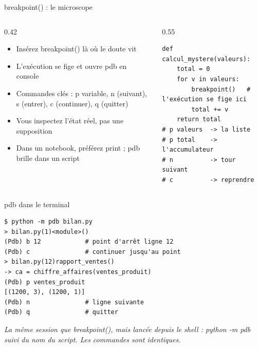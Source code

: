 \documentclass[aspectratio=169,11pt]{beamer}
\begin{document}
\begin{frame}[fragile]{breakpoint() : le microscope}
\begin{columns}[t]
\begin{column}{0.42\textwidth}
\begin{itemize}
  \setlength{\itemsep}{1.5pt}\setlength{\parskip}{0pt}
  \item Insérez breakpoint() là où le doute vit
  \item L'exécution se fige et ouvre pdb en console
  \item Commandes clés : p variable, n (suivant), s (entrer), c (continuer), q (quitter)
  \item Vous inspectez l'état réel, pas une supposition
  \item Dans un notebook, préférez print ; pdb brille dans un script
\end{itemize}
\end{column}
\hspace{0.02\textwidth}
\begin{column}{0.55\textwidth}
\begin{lstlisting}[style=pysmall]
def calcul_mystere(valeurs):
    total = 0
    for v in valeurs:
        breakpoint()   # l'exécution se fige ici
        total += v
    return total
# p valeurs  -> la liste
# p total    -> l'accumulateur
# n          -> tour suivant
# c          -> reprendre
\end{lstlisting}
\end{column}
\end{columns}
\end{frame}

\begin{frame}[fragile]{pdb dans le terminal}

\begin{lstlisting}[style=py]
$ python -m pdb bilan.py
> bilan.py(1)<module>()
(Pdb) b 12            # point d'arrêt ligne 12
(Pdb) c               # continuer jusqu'au point
> bilan.py(12)rapport_ventes()
-> ca = chiffre_affaires(ventes_produit)
(Pdb) p ventes_produit
[(1200, 3), (1200, 1)]
(Pdb) n               # ligne suivante
(Pdb) q               # quitter
\end{lstlisting}
\vspace{0.5pt}

{\small\color{PyGris}\itshape La même session que breakpoint(), mais lancée depuis le shell : python -m pdb suivi du nom du script. Les commandes sont identiques.}

\end{frame}
\end{document}

